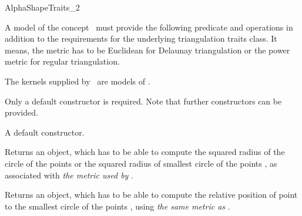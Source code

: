 \begin{ccRefConcept} {AlphaShapeTraits_2}


\ccDefinition
A model of the concept \ccRefName\  must provide the following predicate and
operations in addition to the requirements for the underlying triangulation
traits class.
It means, the metric has to be Euclidean for Delaunay triangulation or the power 
metric for regular triangulation.

\ccRefines
{}


\ccHasModels

The kernels supplied by \cgal\ are models of \ccRefName. 


\ccTypes


\ccCreation

Only a default constructor is required. Note that further constructors
can be provided. 

{A default constructor.}


{Returns an object, which has to be able to compute the squared radius of the
circle of the points  or the squared radius of smallest  circle
of the points , as  associated with {\em the metric used
by }.} 


{Returns an object, which has to be able to compute the relative position of
point  to the smallest circle of the points , using
{\em the same metric as }.}

\end{ccRefConcept}

